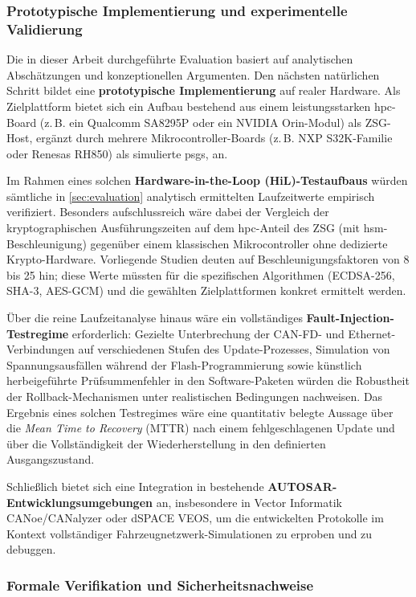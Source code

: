 ﻿\documentclass[12pt,a4paper,twoside]{article}
\begin{document}
\subsubsection{Prototypische Implementierung und experimentelle Validierung}

Die in dieser Arbeit durchgeführte Evaluation basiert auf analytischen
Abschätzungen und konzeptionellen Argumenten. Den nächsten natürlichen
Schritt bildet eine \textbf{prototypische Implementierung} auf realer
Hardware. Als Zielplattform bietet sich ein Aufbau bestehend aus einem
leistungsstarken \gls{hpc}-Board (z.\,B. ein Qualcomm SA8295P oder ein
NVIDIA Orin-Modul) als ZSG-Host, ergänzt durch mehrere
Mikrocontroller-Boards (z.\,B. NXP S32K-Familie oder Renesas RH850) als
simulierte \glspl{psg}, an.

Im Rahmen eines solchen \textbf{Hardware-in-the-Loop (HiL)-Testaufbaus}
würden sämtliche in \cref{sec:evaluation} analytisch ermittelten
Laufzeitwerte empirisch verifiziert. Besonders aufschlussreich wäre
dabei der Vergleich der kryptographischen Ausführungszeiten auf
dem \gls{hpc}-Anteil des ZSG (mit \gls{hsm}-Beschleunigung) gegenüber
einem klassischen Mikrocontroller ohne dedizierte Krypto-Hardware.
Vorliegende Studien deuten auf Beschleunigungsfaktoren von 8 bis 25 hin;
diese Werte müssten für die spezifischen Algorithmen (ECDSA-256,
SHA-3, AES-GCM) und die gewählten Zielplattformen konkret ermittelt werden.

Über die reine Laufzeitanalyse hinaus wäre ein vollständiges
\textbf{Fault-Injection-Test\-regime} erforderlich: Gezielte Unterbrechung
der CAN-FD- und Ethernet-Verbindungen auf verschiedenen Stufen des
Update-Prozesses, Simulation von Spannungsausfällen während der
Flash-Programmierung sowie künstlich herbeigeführte Prüfsummenfehler
in den Software-Paketen würden die Robustheit der Rollback-Mechanismen
unter realistischen Bedingungen nachweisen. Das Ergebnis eines solchen
Testregimes wäre eine quantitativ belegte Aussage über die
\emph{Mean Time to Recovery} (MTTR) nach einem fehlgeschlagenen Update
und über die Vollständigkeit der Wiederherstellung in den definierten
Ausgangszustand.

Schließlich bietet sich eine Integration in bestehende
\textbf{AUTOSAR-Entwicklungsumge\-bungen} an, insbesondere in
Vector Informatik CANoe/CANalyzer oder dSPACE VEOS, um
die entwickelten Protokolle im Kontext vollständiger
Fahrzeugnetzwerk-Simulationen zu erproben und zu debuggen.

\subsubsection{Formale Verifikation und Sicherheitsnachweise}
\end{document}
